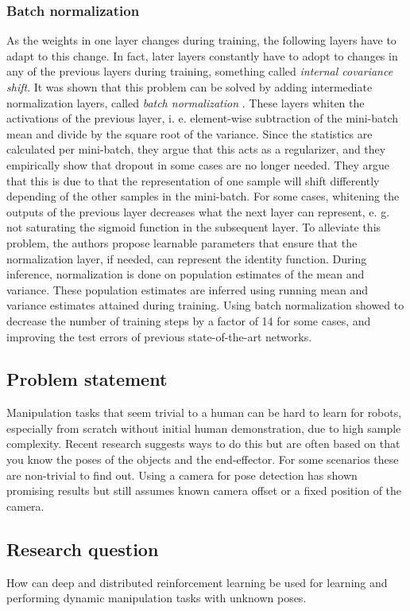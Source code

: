 \subsubsection{Batch normalization}

As the weights in one layer changes during training, the following layers have
to adapt to this change. In fact, later layers constantly have to adopt to
changes in any of the previous layers during training, something called
\textit{internal covariance shift}. It was shown that this problem can be
solved by adding intermediate normalization layers, called \textit{batch
normalization} \cite{ioffe2015batch}. These layers whiten the activations of
the previous layer, i. e. element-wise subtraction of the mini-batch mean and
divide by the square root of the variance. Since the statistics are calculated
per mini-batch, they argue that this acts as a regularizer, and they
empirically show that dropout in some cases are no longer needed. They argue
that this is due to that the representation of one sample will shift
differently depending of the other samples in the mini-batch. For some cases,
whitening the outputs of the previous layer decreases what the next layer can
represent, e. g. not saturating the sigmoid function in the subsequent layer.
To alleviate this problem, the authors propose learnable parameters that ensure
that the normalization layer, if needed, can represent the identity function.
During inference, normalization is done on population estimates of the mean and
variance. These population estimates are inferred using running mean and
variance estimates attained during training. Using batch normalization showed
to decrease the number of training steps by a factor of 14 for some cases, and
improving the test errors of previous state-of-the-art networks.

\subsection{Problem statement}

Manipulation tasks that seem trivial to a human can be hard to learn for
robots, especially from scratch without initial human demonstration, due to
high sample complexity. Recent research suggests ways to do this but are often
based on that you know the poses of the objects and the end-effector. For some
scenarios these are non-trivial to find out. Using a camera for pose detection
has shown promising results but still assumes known camera offset or a fixed
position of the camera.

\subsection{Research question}

How can deep and distributed reinforcement learning be used for learning and
performing dynamic manipulation tasks with unknown poses.
